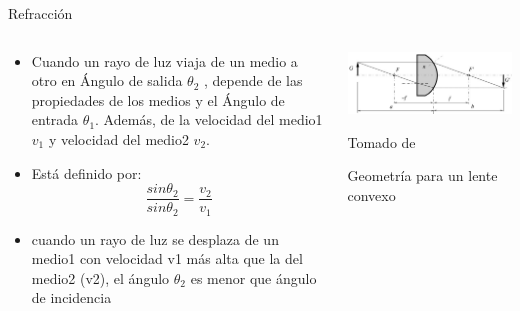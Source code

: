 \documentclass[aspectratio=169]{beamer}
\begin{document}
\begin{frame}{Refracción}
    \begin{columns}[c, onlytextwidth]
        \begin{column}{0.55\textwidth}
            \begin{itemize}
                \item Cuando un rayo de luz viaja de un medio a otro en Ángulo de salida  $\theta_2$ , depende de las propiedades de los medios y el Ángulo de entrada $\theta_1$. Además, de la velocidad del medio1 $v_1$ y velocidad del medio2 $v_2$.
                \item Está definido por:\\
                \begin{equation*}
                     \frac{sin \theta_2}{sin \theta_2}=\frac{v_2}{v_1}
                \end{equation*}
               
                \item cuando un rayo de luz se desplaza de un medio1 con velocidad v1 más alta que la del medio2 (v2), el ángulo $\theta_2$ es menor que ángulo de incidencia
            \end{itemize}
        \end{column}
        \begin{column}{0.45\textwidth}
            \centering
            \includegraphics[width = 0.9\linewidth]{fig/Optica/lense.PNG}
            
            \tiny{Tomado de \cite{Fraden_2016}}
            
            \tiny{Geometría para un lente convexo}
        \end{column}
    \end{columns}
\end{frame}
\end{document}
